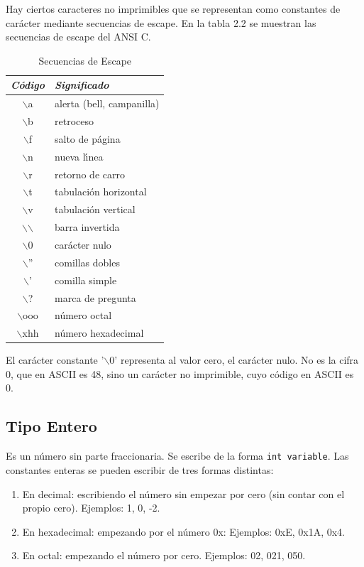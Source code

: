 Hay ciertos caracteres no imprimibles que  se representan como constantes
de car\'acter mediante secuencias de escape. En la tabla 2.2 se muestran las
secuencias de escape del ANSI C.

\begin{table}[!hbp]
\begin{tabular}{|c|l|}
\hline
\em C\'odigo & \em Significado\\ \hline
\hline
$\backslash$a & alerta (bell, campanilla)\\ \hline
$\backslash$b & retroceso\\ \hline
$\backslash$f & salto de p\'agina\\ \hline
$\backslash$n & nueva l\'{\i}nea\\ \hline
$\backslash$r & retorno de carro\\ \hline
$\backslash$t & tabulaci\'on horizontal\\ \hline
$\backslash$v & tabulaci\'on vertical\\ \hline
$\backslash$$\backslash$ & barra invertida\\ \hline
$\backslash$0 & car\'acter nulo\\ \hline
$\backslash$'' & comillas dobles\\ \hline
$\backslash$' & comilla simple\\ \hline
$\backslash$? & marca de pregunta\\ \hline
$\backslash$ooo & n\'umero octal\\ \hline
$\backslash$xhh & n\'umero hexadecimal \\ \hline
\end{tabular}
\caption{Secuencias de Escape}
\end{table}

El car\'acter constante '$\backslash$0' representa al valor cero, el
 car\'acter nulo. No es la cifra 0, que en ASCII es 48, sino un car\'acter
no imprimible, cuyo c\'odigo en ASCII es 0.

\subsection{Tipo Entero}


Es un n\'umero sin parte fraccionaria. Se escribe de la forma \texttt{int 
variable}. Las constantes enteras se pueden 
escribir de tres formas distintas:

\begin{enumerate}

\item En decimal: escribiendo el n\'umero sin empezar por cero (sin contar
con el propio cero). Ejemplos: 1, 0, -2.

\item En hexadecimal: empezando por el n\'umero 0x: Ejemplos: 0xE, 0x1A, 0x4.

\item En octal: empezando el n\'umero por cero. Ejemplos: 02, 021, 050.

\end{enumerate}

